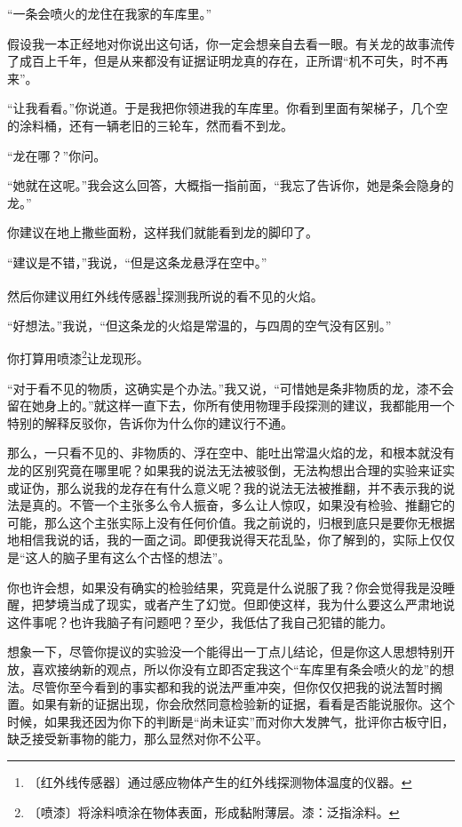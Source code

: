\documentclass[12pt,UTF-8,openany]{ctexbook}
\begin{document}
\begin{normalsize}
    
    “一条会喷火的龙住在我家的车库里。”
    
    假设我一本正经地对你说出这句话，你一定会想亲自去看一眼。有关龙的故事流传了成百上千年，但是从来都没有证据证明龙真的存在，正所谓“机不可失，时不再来”。
    
    “让我看看。”你说道。于是我把你领进我的车库里。你看到里面有架梯子，几个空的涂料桶，还有一辆老旧的三轮车，然而看不到龙。
    
    “龙在哪？”你问。
    
    “她就在这呢。”我会这么回答，大概指一指前面，“我忘了告诉你，她是条会隐身的龙。”
    
    你建议在地上撒些面粉，这样我们就能看到龙的脚印了。
    
    “建议是不错，”我说，“但是这条龙悬浮在空中。”
    
    然后你建议用红外线传感器\footnote{〔红外线传感器〕通过感应物体产生的红外线探测物体温度的仪器。}探测我所说的看不见的火焰。
    
    “好想法。”我说，“但这条龙的火焰是常温的，与四周的空气没有区别。”
    
    你打算用喷漆\footnote{〔喷漆〕将涂料喷涂在物体表面，形成黏附薄层。漆：泛指涂料。}让龙现形。
    
    “对于看不见的物质，这确实是个办法。”我又说，“可惜她是条非物质的龙，漆不会留在她身上的。”就这样一直下去，你所有使用物理手段探测的建议，我都能用一个特别的解释反驳你，告诉你为什么你的建议行不通。
    
    那么，一只看不见的、非物质的、浮在空中、能吐出常温火焰的龙，和根本就没有龙的区别究竟在哪里呢？如果我的说法无法被驳倒，无法构想出合理的实验来证实或证伪，那么说我的龙存在有什么意义呢？我的说法无法被推翻，并不表示我的说法是真的。不管一个主张多么令人振奋，多么让人惊叹，如果没有检验、推翻它的可能，那么这个主张实际上没有任何价值。我之前说的，归根到底只是要你无根据地相信我说的话，我的一面之词。即便我说得天花乱坠，你了解到的，实际上仅仅是“这人的脑子里有这么个古怪的想法”。
    
    你也许会想，如果没有确实的检验结果，究竟是什么说服了我？你会觉得我是没睡醒，把梦境当成了现实，或者产生了幻觉。但即使这样，我为什么要这么严肃地说这件事呢？也许我脑子有问题吧？至少，我低估了我自己犯错的能力。
    
    想象一下，尽管你提议的实验没一个能得出一丁点儿结论，但是你这人思想特别开放，喜欢接纳新的观点，所以你没有立即否定我这个“车库里有条会喷火的龙”的想法。尽管你至今看到的事实都和我的说法严重冲突，但你仅仅把我的说法暂时搁置。如果有新的证据出现，你会欣然同意检验新的证据，看看是否能说服你。这个时候，如果我还因为你下的判断是“尚未证实”而对你大发脾气，批评你古板守旧，缺乏接受新事物的能力，那么显然对你不公平。
    

\end{normalsize}
\end{document}

